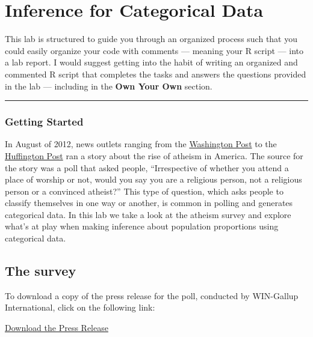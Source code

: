 \documentclass[]{book}
\theoremstyle{definition}
\theoremstyle{definition}
\theoremstyle{definition}
\theoremstyle{remark}
\begin{document}
\chapter{Inference for Categorical
Data}\label{inference-for-categorical-data}

This lab is structured to guide you through an organized process such
that you could easily organize your code with comments --- meaning your
R script --- into a lab report. I would suggest getting into the habit
of writing an organized and commented R script that completes the tasks
and answers the questions provided in the lab --- including in the
\textbf{Own Your Own} section.

\begin{center}\rule{0.5\linewidth}{\linethickness}\end{center}

\subsection{Getting Started}\label{getting-started-3}

In August of 2012, news outlets ranging from the
\href{http://www.washingtonpost.com/national/on-faith/poll-shows-atheism-on-the-rise-in-the-us/2012/08/13/90020fd6-e57d-11e1-9739-eef99c5fb285_story.html}{Washington
Post} to the
\href{http://www.huffingtonpost.com/2012/08/14/atheism-rise-religiosity-decline-in-america_n_1777031.html}{Huffington
Post} ran a story about the rise of atheism in America. The source for
the story was a poll that asked people, ``Irrespective of whether you
attend a place of worship or not, would you say you are a religious
person, not a religious person or a convinced atheist?'' This type of
question, which asks people to classify themselves in one way or
another, is common in polling and generates categorical data. In this
lab we take a look at the atheism survey and explore what's at play when
making inference about population proportions using categorical data.

\section{The survey}\label{the-survey}

To download a copy of the press release for the poll, conducted by
WIN-Gallup International, click on the following link:

\href{https://github.com/nulib/kuyper-stat202/raw/master/assets/support_doc/Global_INDEX_of_Religiosity_and_Atheism_PR_6.pdf}{Download
the Press Release}
\end{document}
